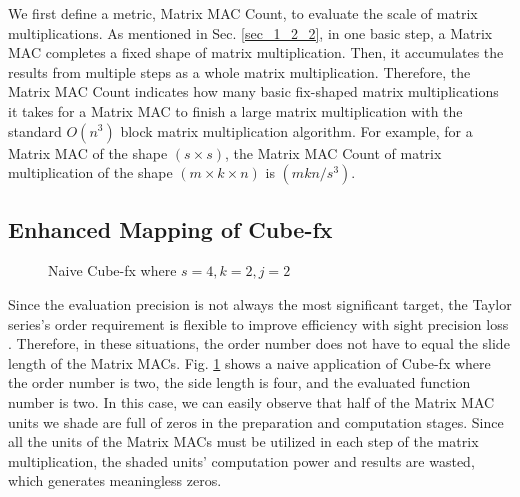 We first define a metric, Matrix MAC Count, to evaluate the scale of matrix multiplications. As mentioned in Sec. \ref{sec_1_2_2}, in one basic step, a Matrix MAC completes a fixed shape of matrix multiplication. Then, it accumulates the results from multiple steps as a whole matrix multiplication. Therefore, the Matrix MAC Count indicates how many basic fix-shaped matrix multiplications it takes for a Matrix MAC to finish a large matrix multiplication with the standard $O(n^3)$ block matrix multiplication algorithm. For example, for a Matrix MAC of the shape $(s \times s)$, the Matrix MAC Count of matrix multiplication of the shape $(m \times k \times n)$ is $(mkn / s^3)$. 

\subsection{Enhanced Mapping of Cube-fx}

\begin{figure}[t]
    \caption{Naive Cube-fx where $s = 4, k = 2, j = 2$}
    \label{fig:problem}
    \end{figure}

Since the evaluation precision is not always the most significant target, the Taylor series's order requirement is flexible to improve efficiency with sight precision loss \cite{math}. Therefore, in these situations, the order number does not have to equal the slide length of the Matrix MACs. Fig. \ref{fig:problem} shows a naive application of Cube-fx where the order number is two, the side length is four, and the evaluated function number is two. In this case, we can easily observe that half of the Matrix MAC units we shade are full of zeros in the preparation and computation stages. Since all the units of the Matrix MACs must be utilized in each step of the matrix multiplication, the shaded units' computation power and results are wasted, which generates meaningless zeros.

